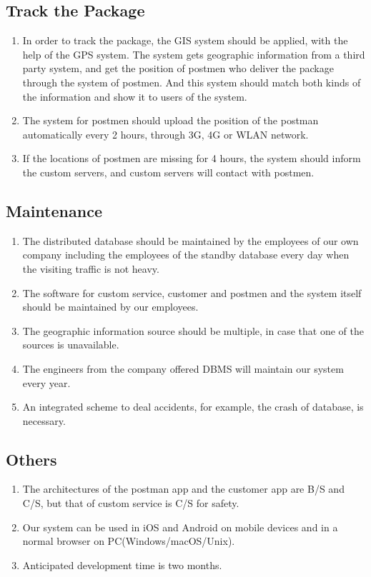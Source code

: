 \documentclass[12pt]{scrreprt}
\begin{document}
\subsection{Track the Package}
\begin{enumerate}
  \item In order to track the package, the GIS system should be applied,
  with the help of the GPS system. The system gets geographic information
  from a third party system, and get the position of postmen who deliver
  the package through the system of postmen. And this system should match
  both kinds of the information and show it to users of the system.
  \item The system for postmen should upload the position of the postman
  automatically every 2 hours, through 3G, 4G or WLAN network.
  \item If the locations of postmen are missing for 4 hours, the system
  should inform the custom servers, and custom servers will contact with
  postmen.
\end{enumerate}

\subsection{Maintenance}
\begin{enumerate}
  \item The distributed database should be maintained by the employees
  of our own company including the employees of the standby database
  every day when the visiting traffic is not heavy.
  \item The software for custom service, customer and postmen and the
  system itself should be maintained by our employees.
  \item The geographic information source should be multiple, in case
  that one of the sources is unavailable.
  \item The engineers from the company offered DBMS will maintain
  our system every year.
  \item An integrated scheme to deal accidents, for example, the crash
  of database, is necessary.
\end{enumerate}

\subsection{Others}
\begin{enumerate}
  \item The architectures of the postman app and the customer app are B/S
  and C/S, but that of custom service is C/S for safety.
  \item Our system can be used in iOS and Android on mobile devices and in
  a normal browser on PC(Windows/macOS/Unix).
  \item Anticipated development time is two months.
\end{enumerate}
\end{document}

